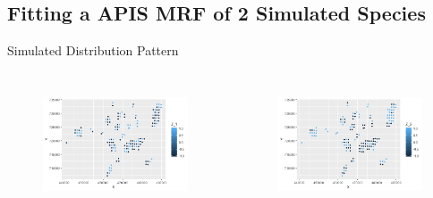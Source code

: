 \documentclass{beamer}
\begin{document}
\subsection{Fitting a APIS MRF of 2 Simulated Species}
\begin{frame}{Simulated Distribution Pattern}
	\begin{columns}
		\column{6cm}
		\begin{figure}[ht]
			\centering
			\includegraphics[scale=.4]{fig/Island_2spp/Z1.jpeg}
			\label{Z1}
		\end{figure}
		\column{6cm}
		\begin{figure}[ht]
			\centering
			\includegraphics[scale=.4]{fig/Island_2spp/Z2.jpeg}
			\label{Z2}
		\end{figure}
		
	\end{columns}
\end{frame}
\end{document}
